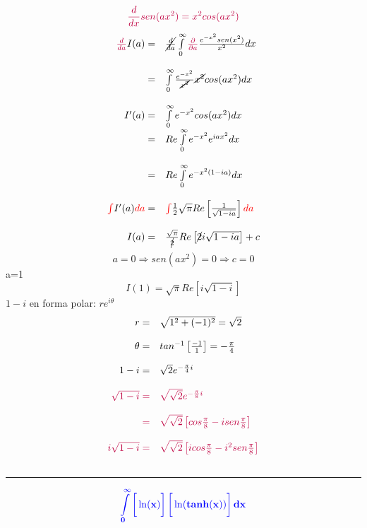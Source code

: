 \documentclass{article}
\theoremstyle{definition}
\begin{document}
\[\textcolor{purple}{\frac{d}{dx}sen(ax^2)=x^2cos(ax^2)}\]
\[
\begin{array}{rl}
	\textcolor{purple}{\frac{d}{da}}I(a)=& \cancel{\frac{d}{da}}\int\limits^{\infty}_0\textcolor{purple}{\frac{\partial}{\partial a}}\frac{e^{-x^2}sen(x^2)}{x^2}dx\\ \\
	=& \int\limits^{\infty}_0\frac{e^{-x^2}}{\cancel{x^2}}\cancel{x^2}cos(ax^2)dx\\ \\
	I'(a)=&\int\limits^{\infty}_0e^{-x^2}cos(ax^2)dx\\
	=& Re\int\limits^{\infty}_0e^{-x^2}e^{iax^2}dx\\ \\
	=& Re\int\limits^{\infty}_0e^{-x^2(1-ia)}dx\\ \\
	\textcolor{red}{\int}I'(a)\textcolor{red}{da}=&\textcolor{red}{\int}\frac{1}{2}\sqrt{\pi} Re\left[\frac{1}{\sqrt{1-ia}}\right]\textcolor{red}{da} \\ \\
	
	I(a)=& \frac{\sqrt{\pi}}{\cancel{2}}Re\left[\cancel{2}i\sqrt{1-ia}\right]+c
\end{array}
\]
\[a=0\Rightarrow sen(ax^2)=0\Rightarrow c=0\]
a=1
\[I(1)=\sqrt{\pi}Re\left[i\sqrt{1-i}\right]\]
$1-i$ en forma polar: $re^{i\theta}$
\[
\begin{array}{rl}
	r=& \sqrt{1^2+(-1)^2}=\sqrt{2}\\ \\
	\theta=& tan^{-1}\left[\frac{-1}{1}\right]=-\frac{\pi}{4}\\ \\
	1-i=& \sqrt{2}e^{-\frac{\pi}{4}i}\\ \\
	\textcolor{purple}{\sqrt{1-i}=}&\textcolor{purple}{\sqrt{\sqrt{2}}e^{-\frac{\pi}{8}i}}\\ \\
	 \textcolor{purple}{=}& \textcolor{purple}{\sqrt{\sqrt{2}}\left[cos\frac{\pi}{8}-i sen\frac{\pi}{8}\right]}\\ \\
	 \textcolor{purple}{i\sqrt{1-i}=}&\textcolor{purple}{\sqrt{\sqrt{2}}\left[icos\frac{\pi}{8}-i^2 sen\frac{\pi}{8}\right]}\\ \\
\end{array}
\]
\par\noindent\rule{\textwidth}{0.5pt}
\[\textcolor{blue}{\mathbf{\int\limits^{\infty}_0\left[\vphantom{\frac{0}{0}}\ln (x)\right]\left[\vphantom{\frac{0}{0}}\ln (tanh(x))\right]dx}}\]
\end{document}

